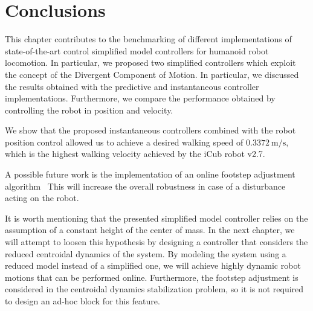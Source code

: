 \section{Conclusions\label{sec:conclusion_simplified_benchmarking}}
This chapter contributes to the benchmarking of different implementations of state-of-the-art control simplified model controllers for humanoid robot locomotion. In particular, we proposed two simplified controllers which exploit the concept of the Divergent Component of Motion. 
In particular, we discussed the results obtained with the predictive and instantaneous controller implementations. Furthermore, we compare the performance obtained by controlling the robot in position and velocity.
\par
We show that the proposed instantaneous controllers combined with the robot position control allowed us to achieve a desired walking speed of $\SI{0.3372}{\meter \per \second}$, which is the highest walking velocity achieved by the iCub robot v2.7.
\par
A possible future work is the implementation of an online footstep adjustment algorithm~\citep{Griffin2016,Shafiee-Ashtiani2017a,Shafiee2019OnlineRobots} This will increase the overall robustness in case of a disturbance acting on the robot.
\par
It is worth mentioning that the presented simplified model controller relies on the assumption of a constant height of the center of mass. In the next chapter, we will attempt to loosen this hypothesis by designing a controller that considers the reduced centroidal dynamics of the system. By modeling the system using a reduced model instead of a simplified one, we will achieve highly dynamic robot motions that can be performed online. Furthermore, the footstep adjustment is considered in the centroidal dynamics stabilization problem, so it is not required to design an ad-hoc block for this feature.